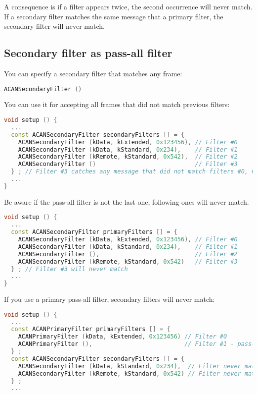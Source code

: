 \documentclass[10pt, a4paper, obeyspaces, openany]{extarticle}
\newcommand \subsectionLabel[2]{\subsection{#1}\label{subsec:#2}}
\begin{document}
A consequence is if a filter appears twice, the second occurrence will never match. If a secondary filter matches the same message that a primary filter, the secondary filter will never match.


\subsectionLabel{Secondary filter as pass-all filter}{passAllSecondaryFilter}

You can specify a secondary filter that matches any frame: 
{ \small\begin{lstlisting}[language=c++]
    ACANSecondaryFilter ()
\end{lstlisting}}

You can use it for accepting all frames that did not match previous filters:
{ \small\begin{lstlisting}[language=c++]
void setup () {
  ...
  const ACANSecondaryFilter secondaryFilters [] = {
    ACANSecondaryFilter (kData, kExtended, 0x123456), // Filter #0
    ACANSecondaryFilter (kData, kStandard, 0x234),    // Filter #1
    ACANSecondaryFilter (kRemote, kStandard, 0x542),  // Filter #2
    ACANSecondaryFilter ()                            // Filter #3
  } ; // Filter #3 catches any message that did not match filters #0, #1 and #2
  ...
}
\end{lstlisting}}

Be aware if the pass-all filter is not the last one, following ones will never match.
{ \small\begin{lstlisting}[language=c++]
void setup () {
  ...
  const ACANSecondaryFilter primaryFilters [] = {
    ACANSecondaryFilter (kData, kExtended, 0x123456), // Filter #0
    ACANSecondaryFilter (kData, kStandard, 0x234),    // Filter #1
    ACANSecondaryFilter (),                           // Filter #2
    ACANSecondaryFilter (kRemote, kStandard, 0x542)   // Filter #3
  } ; // Filter #3 will never match
  ...
}
\end{lstlisting}}

If you use a primary pass-all filter, secondary filters will never match:
{ \small\begin{lstlisting}[language=c++]
void setup () {
  ...
  const ACANPrimaryFilter primaryFilters [] = {
    ACANPrimaryFilter (kData, kExtended, 0x123456) // Filter #0
    ACANPrimaryFilter (),                          // Filter #1 - pass-all
  } ;
  const ACANSecondaryFilter secondaryFilters [] = {
    ACANSecondaryFilter (kData, kStandard, 0x234),  // Filter never matches
    ACANSecondaryFilter (kRemote, kStandard, 0x542) // Filter never matches
  } ;
  ...
\end{lstlisting}}
\end{document}
